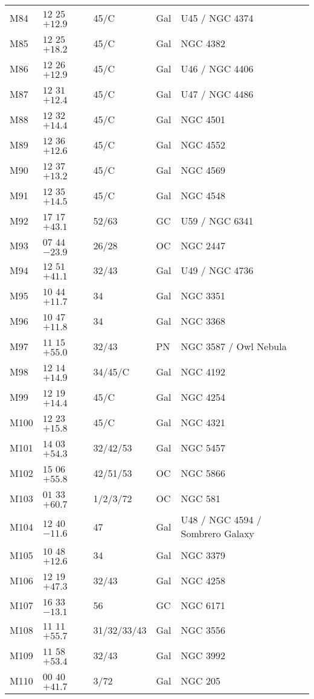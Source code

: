 \begin{table}[p]
\begin{tabular}{llllll}
M84&$12$ $25$ $+12.9$&45/C&Gal&U45 / NGC 4374\\
M85&$12$ $25$ $+18.2$&45/C&Gal&NGC 4382\\
M86&$12$ $26$ $+12.9$&45/C&Gal&U46 / NGC 4406\\
M87&$12$ $31$ $+12.4$&45/C&Gal&U47 / NGC 4486\\
M88&$12$ $32$ $+14.4$&45/C&Gal&NGC 4501\\
M89&$12$ $36$ $+12.6$&45/C&Gal&NGC 4552\\
M90&$12$ $37$ $+13.2$&45/C&Gal&NGC 4569\\
M91&$12$ $35$ $+14.5$&45/C&Gal&NGC 4548\\
M92&$17$ $17$ $+43.1$&52/63&GC&U59 / NGC 6341\\
M93&$07$ $44$ $-23.9$&26/28&OC&NGC 2447\\
M94&$12$ $51$ $+41.1$&32/43&Gal&U49 / NGC 4736\\
M95&$10$ $44$ $+11.7$&34&Gal&NGC 3351\\
M96&$10$ $47$ $+11.8$&34&Gal&NGC 3368\\
M97&$11$ $15$ $+55.0$&32/43&PN&NGC 3587 / Owl Nebula\\
M98&$12$ $14$ $+14.9$&34/45/C&Gal&NGC 4192\\
M99&$12$ $19$ $+14.4$&45/C&Gal&NGC 4254\\
M100&$12$ $23$ $+15.8$&45/C&Gal&NGC 4321\\
M101&$14$ $03$ $+54.3$&32/42/53&Gal&NGC 5457\\
M102&$15$ $06$ $+55.8$&42/51/53&OC&NGC 5866\\
M103&$01$ $33$ $+60.7$&1/2/3/72&OC&NGC 581\\
M104&$12$ $40$ $-11.6$&47&Gal&U48 / NGC 4594 / Sombrero Galaxy\\
M105&$10$ $48$ $+12.6$&34&Gal&NGC 3379\\
M106&$12$ $19$ $+47.3$&32/43&Gal&NGC 4258\\
M107&$16$ $33$ $-13.1$&56&GC&NGC 6171\\
M108&$11$ $11$ $+55.7$&31/32/33/43&Gal&NGC 3556\\
M109&$11$ $58$ $+53.4$&32/43&Gal&NGC 3992\\
M110&$00$ $40$ $+41.7$&3/72&Gal&NGC 205\\
\hline
\end{tabular}
\end{table}

\clearpage

\twocolumn

